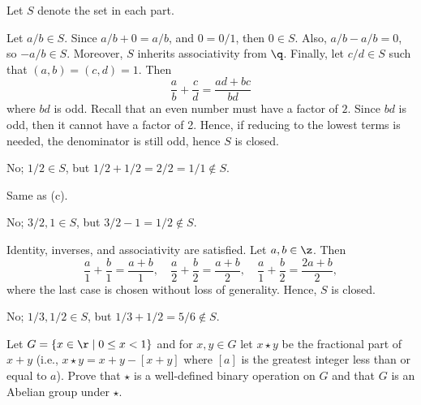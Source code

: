\begin{sol}
    Let $S$ denote the set in each part.
    \begin{subproblems}
        \item Let $a/b \in S$. Since $a/b + 0 = a/b$, and $0 = 0/1$, then $0 \in S$. Also, $a/b - a/b = 0$, so $-a/b \in S$. Moreover, $S$ inherits associativity from $\q$. Finally, let $c/d \in S$ such that $(a, b) = (c, d) = 1$. Then
        \[\frac ab + \frac cd = \frac{ad + bc}{bd}\]
        where $bd$ is odd. Recall that an even number must have a factor of $2$. Since $bd$ is odd, then it cannot have a factor of 2. Hence, if reducing to the lowest terms is needed, the denominator is still odd, hence $S$ is closed.
        \item No; $1/2 \in S$, but $1/2 + 1/2 = 2/2 = 1/1 \not\in S$.
        \item Same as (c).
        \item No; $3/2, 1 \in S$, but $3/2 - 1 = 1/2 \not\in S$.
        \item Identity, inverses, and associativity are satisfied. Let $a, b \in \z$. Then
        \[\frac a1 + \frac b1 = \frac{a + b}1, \quad \frac a2 + \frac b2 = \frac{a + b}2, \quad \frac a1 + \frac b2 = \frac{2a + b}2,\]
        where the last case is chosen without loss of generality. Hence, $S$ is closed.
        \item No; $1/3, 1/2 \in S$, but $1/3 + 1/2 = 5/6 \not\in S$. \qh
    \end{subproblems}
\end{sol}

\begin{specialexercise}\label{ex1.1.7}
    Let $G = \{ x \in \r \mid 0 \le x < 1 \}$ and for $x, y \in G$ let $x \star y$ be the fractional part of $x + y$ (i.e., $x \star y = x + y - [x + y]$ where $[a]$ is the greatest integer less than or equal to $a$). Prove that $\star$ is a well-defined binary operation on $G$ and that $G$ is an Abelian group under $\star$.
\end{specialexercise}


